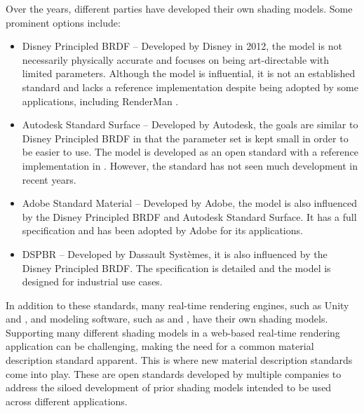 Over the years, different parties have developed their own shading models. Some prominent options include:

\begin{itemize}
  \item{Disney Principled \gls{BRDF}} \cite{disney2012pbr} – Developed by Disney in 2012, the model is not necessarily physically accurate and focuses on being art-directable with limited parameters. Although the model is influential, it is not an established standard and lacks a reference implementation despite being adopted by some applications, including \gls{RenderMan} \cite{renderManDisneyPbrDocs}.
  \item{Autodesk Standard Surface} \cite{autodeskStandardSurface} – Developed by Autodesk, the goals are similar to Disney Principled \gls{BRDF} in that the parameter set is kept small in order to be easier to use. The model is developed as an open standard with a reference implementation in . However, the standard has not seen much development in recent years.
  \item{Adobe Standard Material} \cite{adobeStandardMaterial} – Developed by Adobe, the model is also influenced by the Disney Principled \gls{BRDF} and Autodesk Standard Surface. It has a full specification and has been adopted by Adobe for its applications.
  \item{\gls{DSPBR}} \cite{dspbrModel} – Developed by Dassault Systèmes, it is also influenced by the Disney Principled \gls{BRDF}. The specification is detailed and the model is designed for industrial use cases.
\end{itemize}

In addition to these standards, many real-time rendering engines, such as \gls{Unity} and , and modeling software, such as  and , have their own shading models. Supporting many different shading models in a web-based real-time rendering application can be challenging, making the need for a common material description standard apparent. This is where new material description standards come into play. These are open standards developed by multiple companies to address the siloed development of prior shading models intended to be used across different applications.

